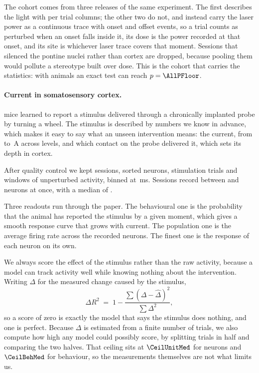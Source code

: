 \documentclass[11pt,letterpaper]{article}
\begin{document}
The cohort comes from three releases of the same experiment. The first describes the
light with per trial columns; the other two do not, and instead carry the laser power
as a continuous trace with onset and offset events, so a trial counts as perturbed when
an onset falls inside it, its dose is the power recorded at that onset, and its site is
whichever laser trace covers that moment. Sessions that silenced the pontine nuclei
rather than cortex are dropped, because pooling them would pollute a stereotype built
over dose. This is the cohort that carries the statistics: with \AllAnimals{} animals
an exact test can reach $p = \AllPFloor$.

\paragraph{Current in somatosensory cortex.}
\NAnimals{} mice learned to report a stimulus delivered
through a chronically implanted probe by turning a wheel. The stimulus is described by
numbers we know in advance, which makes it easy to say what an unseen intervention
means: the current, from \AmpMin{} to \AmpMax\,\textmu A across \NAmps{} levels, and
which contact on the probe delivered it, which sets its depth in cortex.

After quality control we kept \NSessions{} sessions, \NUnits{} sorted neurons,
\NStimTrials{} stimulation trials and \NUnpTrials{} windows of unperturbed activity,
binned at \BinMs\,ms. Sessions record between \MinUnits{} and \MaxUnits{} neurons at
once, with a median of \MedUnits.

Three readouts run through the paper. The behavioural one is the probability that the
animal has reported the stimulus by a given moment, which gives a smooth response
curve that grows with current. The population one is the average firing rate across
the recorded neurons. The finest one is the response of each neuron on its own.

We always score the effect of the stimulus rather than the raw activity, because a
model can track activity well while knowing nothing about the intervention. Writing
$\Delta$ for the measured change caused by the stimulus,
\[
\Delta R^2 \;=\; 1 - \frac{\sum (\Delta - \widehat{\Delta})^2}{\sum \Delta^2},
\]
so a score of zero is exactly the model that says the stimulus does nothing, and one is
perfect. Because $\Delta$ is estimated from a finite number of trials, we also compute
how high any model could possibly score, by splitting trials in half and comparing the
two halves. That ceiling sits at $\CeilUnitMed$ for neurons and $\CeilBehMed$ for
behaviour, so the measurements themselves are not what limits us.
\end{document}
